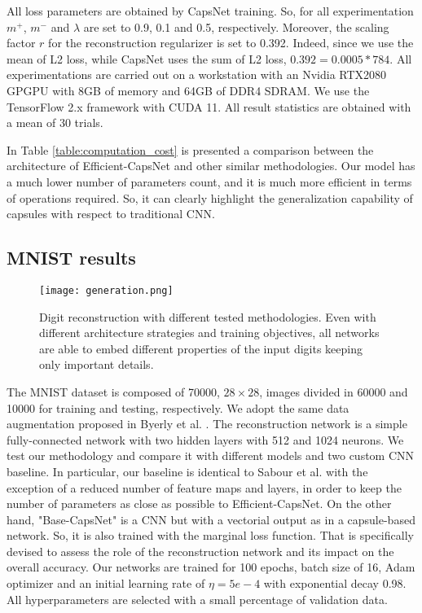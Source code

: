 \documentclass{article}
\begin{document}
All loss parameters are obtained by CapsNet \cite{sabour2017dynamic} training. So, for all experimentation $m^{+}$, $m^{-}$ and $\lambda$ are set to 0.9, 0.1 and 0.5, respectively. Moreover, the scaling factor $r$ for the reconstruction regularizer is set to 0.392. Indeed, since we use the mean of L2 loss, while CapsNet uses the sum of L2 loss, $0.392=0.0005 * 784$. All experimentations are carried out on a workstation with an Nvidia RTX2080 GPGPU with 8GB of memory and 64GB of DDR4 SDRAM. We use the TensorFlow 2.x framework with CUDA 11. All result statistics are obtained with a mean of 30 trials.
 
In Table \ref{table:computation_cost} is presented a comparison between the architecture of Efficient-CapsNet and other similar methodologies. Our model has a much lower number of parameters count, and it is much more efficient in terms of operations required. So, it can clearly highlight the generalization capability of capsules with respect to traditional CNN.

\subsection{MNIST results}
\begin{figure}
    \centering
    \texttt{[image: generation.png]}
    \caption{Digit reconstruction with different tested methodologies. Even with different architecture strategies and training objectives, all networks are able to embed different properties of the input digits keeping only important details.}
    \label{fig:generation}
\end{figure}

The MNIST dataset \cite{lecun1998mnist} is composed of 70000, $28 \times 28$, images divided in 60000 and 10000 for training and testing, respectively. We adopt the same data augmentation proposed in Byerly et al. \cite{byerly2020branching}. The reconstruction network is a simple fully-connected network with two hidden layers with 512 and 1024 neurons. We test our methodology and compare it with different models and two custom CNN baseline. In particular, our baseline is identical to Sabour et al. \cite{sabour2017dynamic} with the exception of a reduced number of feature maps and layers, in order to keep the number of parameters as close as possible to Efficient-CapsNet. On the other hand, "Base-CapsNet" is a CNN but with a vectorial output as in a capsule-based network. So, it is also trained with the marginal loss function. That is specifically devised to assess the role of the reconstruction network and its impact on the overall accuracy. Our networks are trained for 100 epochs, batch size of 16, Adam \cite{kingma2014adam} optimizer and an initial learning rate of $\eta=5e-4$ with exponential decay 0.98. All hyperparameters are selected with a small percentage of validation data.
\end{document}
